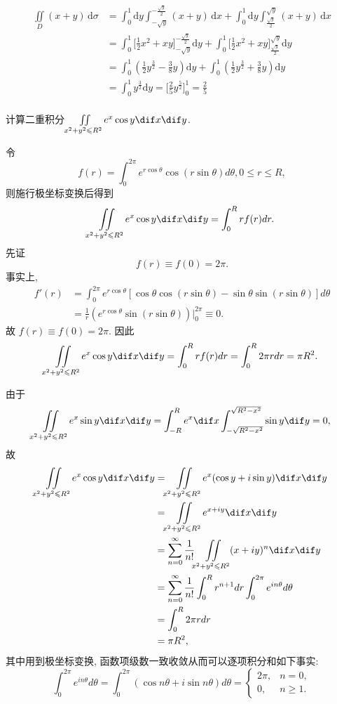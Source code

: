 \documentclass[color=green,titlestyle=hang]{elegantbook}%
\begin{document}
\begin{Solution} \begin{align*}\iint\limits_{D}(x+y)\,\mathrm{d}\sigma&=\int_{0}^{1}\mathrm{d}y\!\int_{-\sqrt{y}}^{-\frac{\sqrt{y}}{2}}(x+y)\,\mathrm{d}x+\int_{0}^{1}\mathrm{d}y\!\int_{\frac{\sqrt{y}}{2}}^{\sqrt{y}}(x+y)\,\mathrm{d}x\\
&=\int_{0}^{1}\biggl[\frac{1}{2}x^2+xy\biggl]_{-\sqrt{y}}^{-\frac{\sqrt{y}}{2}}\mathrm{d}y+\int_{0}^{1}\biggl[\frac{1}{2}x^2+xy\biggl]_{\frac{\sqrt{y}}{2}}^{\sqrt{y}}\mathrm{d}y\\
&=\int_{0}^{1}\left(\frac{1}{2}y^{\frac{3}{2}}-\frac{3}{8}y\right)\mathrm{d}y+\int_{0}^{1}\left(\frac{1}{2}y^{\frac{3}{2}}+\frac{3}{8}y\right)\mathrm{d}y\\
&=\int_{0}^{1}y^{\frac{3}{2}}\mathrm{d}y=\biggl[\frac{2}{5}y^{\frac{5}{2}}\biggl]_{0}^{1}=\frac{2}{5}\\
\end{align*}
\end{Solution}

\begin{exercise}
计算二重积分 $\iint\limits_{x^2+y^2\leqslant R^2}e^x\cos y\dif x\dif y$.
\end{exercise}\begin{Solution}
令\[f(r)=\int_0^{2\pi}e^{r\cos\theta}\cos(r\sin\theta)d\theta,0\leqslant r\leqslant R,\]
则施行极坐标变换后得到
\[\iint\limits_{x^2+y^2\leqslant R^2}e^x\cos y\dif x\dif y=\int_0^Rrf(r)dr.\]
先证\[f(r)\equiv f(0)=2\pi.\]
事实上,\begin{align*}
f'(r)&=\int_0^{2\pi}e^{r\cos\theta}[\cos\theta \cos(r\sin\theta) -\sin\theta \sin (r\sin\theta)]d\theta\\
&=\frac{1}{r}\left(e^{r\cos\theta}\sin(r\sin\theta)\right)\Big|_0^{2\pi}\equiv 0.
\end{align*}
故 $f(r)\equiv f(0)=2\pi$. 因此
\[\iint\limits_{x^2+y^2\leqslant R^2}e^x\cos y\dif x\dif y=\int_0^Rrf(r)dr=\int_0^R2\pi rdr=\pi R^2.\]
\end{Solution}\begin{Solution}
由于\[\iint\limits_{x^2+y^2\leqslant R^2}e^x\sin y\dif x\dif y=\int_{-R}^Re^x\dif x\int_{-\sqrt{R^2-x^2}}^{\sqrt{R^2-x^2}}\sin y\dif y=0,\]
故\[\begin{split}\iint\limits_{x^2+y^2\leqslant R^2}e^x\cos y\dif x\dif y&=\iint\limits_{x^2+y^2\leqslant R^2}e^x(\cos y+i\sin 
y)\dif x\dif y\\ 
&=\iint\limits_{x^2+y^2\leqslant R^2}e^{x+iy}\dif x\dif y\\ 
&=\sum_{n=0}^\infty\frac{1}{n!}\iint\limits_{x^2+y^2\leqslant 
	R^2}(x+iy)^n\dif x\dif y\\ 
&=\sum_{n=0}^\infty\frac{1}{n!}\int_0^R 
r^{n+1}dr\int_0^{2\pi}e^{in\theta}d\theta\\ 
&=\int_0^R2\pi rdr\\ 
&=\pi R^2,\end{split}\]
其中用到极坐标变换, 函数项级数一致收敛从而可以逐项积分和如下事实:
\[\int_0^{2\pi}e^{in\theta}d\theta=\int_0^{2\pi}(\cos n\theta +i\sin n\theta)d\theta=\begin{cases}2\pi,&n=0,\\ 
0,& n\geqslant 1.\end{cases}\]
\end{Solution}
\end{document}
